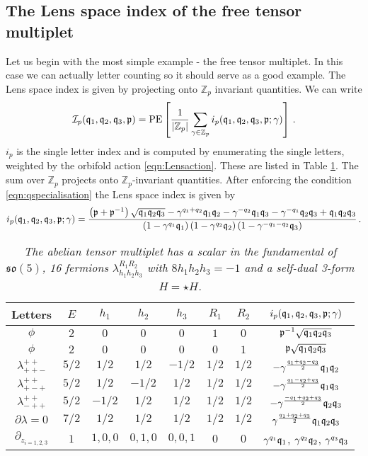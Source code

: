 \documentclass[main.tex]{subfiles}
\begin{document}
\subsection{The Lens space index of the free tensor multiplet}
Let us begin with the most simple example - the free tensor multiplet. In this case we can actually letter counting so it should serve as a good example.
The Lens space index is given by projecting onto $\mathbb{Z}_p$ invariant quantities. We can write
\begin{equation}\label{eqn:freetensor}
\mathcal{I}_{p}(\mathfrak{q}_1,\mathfrak{q}_2,\mathfrak{q}_3,\mathfrak{p})=\operatorname{\mathrm{PE}}\left[\frac{1}{|\mathbb{Z}_p|}\sum_{\gamma\in\mathbb{Z}_p}i_p(\mathfrak{q}_1,\mathfrak{q}_2,\mathfrak{q}_3,\mathfrak{p};\gamma)\right]\,.
\end{equation}
$i_p$ is the single letter index and is computed by enumerating the single letters, weighted by the orbifold action \eqref{eqn:Lensaction}. These are listed in Table \ref{fig:freetensor}. The sum over $\mathbb{Z}_p$ projects onto $\mathbb{Z}_p$-invariant quantities. After enforcing the condition \eqref{eqn:qspecialisation} the Lens space index is given by
\begin{equation}\label{eqn:freetensorsing}
i_p(\mathfrak{q}_1,\mathfrak{q}_2,\mathfrak{q}_3,\mathfrak{p};\gamma)=\frac{\left(\mathfrak{p}+\mathfrak{p}^{-1}\right)\sqrt{\mathfrak{q}_1\mathfrak{q}_2\mathfrak{q}_3}-\gamma^{q_1+q_2}\mathfrak{q}_1\mathfrak{q}_2-\gamma^{-q_2}\mathfrak{q}_1\mathfrak{q}_3-\gamma^{-q_1}\mathfrak{q}_2\mathfrak{q}_3+\mathfrak{q}_1\mathfrak{q}_2\mathfrak{q}_3}{\left(1-\gamma^{q_1}\mathfrak{q}_1\right)\left(1-\gamma^{q_2}\mathfrak{q}_2\right)\left(1-\gamma^{-q_1-q_2}\mathfrak{q}_3\right)}\,.
\end{equation}
\begin{table}
\centering
\begin{tabular}{|c||c|c|c|c|c|c|c|} 
\hline
\textrm{Letters}  & $E$ & $h_1$ & $h_2$ & $h_3$ & $R_1$ & $R_2$ &$i_p(\mathfrak{q}_1,\mathfrak{q}_2,\mathfrak{q}_3,\mathfrak{p};\gamma)$\\ 
  \hline\hline
 $\phi$ & $2$ & $0$ & $0$ & $0$ & $1$ & $0$ & $\mathfrak{p}^{-1}\sqrt{\mathfrak{q}_1\mathfrak{q}_2\mathfrak{q}_3}$\\ 
 \hline
 $\phi$ & $2$ & $0$ & $0$ & $0$ & $0$ & $1$ & $\mathfrak{p}\sqrt{\mathfrak{q}_1\mathfrak{q}_2\mathfrak{q}_3}$\\ 
 \hline
   $\lambda_{++-}^{++}$ & $5/2$ & $1/2$ & $1/2$ & $-1/2$ & $1/2$ & $1/2$& $-\gamma^{\frac{q_1+q_2-q_3}{2}}\mathfrak{q}_1\mathfrak{q}_2$\\ 
 \hline
   $\lambda_{+-+}^{++}$ & $5/2$ & $1/2$ & $-1/2$ & $1/2$ & $1/2$ & $1/2$& $-\gamma^{\frac{q_1-q_2+q_3}{2}}\mathfrak{q}_1\mathfrak{q}_3$\\ 
 \hline
    $\lambda_{-++}^{++}$ & $5/2$ & $-1/2$ & $1/2$ & $1/2$ & $1/2$ & $1/2$&$-\gamma^{\frac{-q_1+q_2+q_3}{2}}\mathfrak{q}_2\mathfrak{q}_3$\\ 
 \hline\hline
      $\partial\lambda=0$& $7/2$ & $1/2$ & $1/2$ & $1/2$ & $1/2$ & $1/2$ & $\gamma^{\frac{q_1+q_2+q_3}{2}}\mathfrak{q}_1\mathfrak{q}_2\mathfrak{q}_3$\\ 
 \hline\hline
   $\partial_{z_{i=1,2,3}}$ & $1$ & $1,0,0$ & $0,1,0$ & $0,0,1$ & $0$ & $0$ &$\gamma^{q_1}\mathfrak{q}_1$, $\gamma^{q_2}\mathfrak{q}_2$, $\gamma^{q_3}\mathfrak{q}_3$\\ 
 \hline
\end{tabular}
\caption{\textit{The abelian tensor multiplet has a scalar in the fundamental of $\mathfrak{so}(5)$, 16 fermions $\lambda^{R_1R_2}_{h_1h_2h_3}$ with $8h_1h_2h_3=-1$ and a self-dual 3-form $H=\star H$.}}
\label{fig:freetensor}
\end{table}
\end{document}
